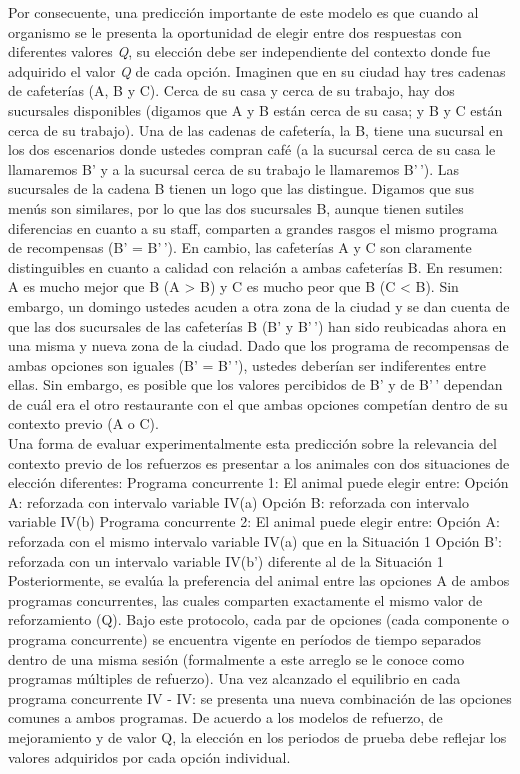 \documentclass[
  letterpaper,
]{book}
\begin{document}
Por consecuente, una predicción importante de este modelo es que cuando
al organismo se le presenta la oportunidad de elegir entre dos
respuestas con diferentes valores \emph{Q}, su elección debe ser
independiente del contexto donde fue adquirido el valor \emph{Q} de cada
opción. Imaginen que en su ciudad hay tres cadenas de cafeterías (A, B y
C). Cerca de su casa y cerca de su trabajo, hay dos sucursales
disponibles (digamos que A y B están cerca de su casa; y B y C están
cerca de su trabajo). Una de las cadenas de cafetería, la B, tiene una
sucursal en los dos escenarios donde ustedes compran café (a la sucursal
cerca de su casa le llamaremos B' y a la sucursal cerca de su trabajo le
llamaremos B'\,'). Las sucursales de la cadena B tienen un logo que las
distingue. Digamos que sus menús son similares, por lo que las dos
sucursales B, aunque tienen sutiles diferencias en cuanto a su staff,
comparten a grandes rasgos el mismo programa de recompensas (B' =
B'\,'). En cambio, las cafeterías A y C son claramente distinguibles en
cuanto a calidad con relación a ambas cafeterías B. En resumen: A es
mucho mejor que B (A \textgreater{} B) y C es mucho peor que B (C
\textless{} B). Sin embargo, un domingo ustedes acuden a otra zona de la
ciudad y se dan cuenta de que las dos sucursales de las cafeterías B (B'
y B'\,') han sido reubicadas ahora en una misma y nueva zona de la
ciudad. Dado que los programa de recompensas de ambas opciones son
iguales (B' = B'\,'), ustedes deberían ser indiferentes entre ellas. Sin
embargo, es posible que los valores percibidos de B' y de B'\,' dependan
de cuál era el otro restaurante con el que ambas opciones competían
dentro de su contexto previo (A o C).\\
Una forma de evaluar experimentalmente esta predicción sobre la
relevancia del contexto previo de los refuerzos es presentar a los
animales con dos situaciones de elección diferentes: Programa
concurrente 1: El animal puede elegir entre: Opción A: reforzada con
intervalo variable IV(a) Opción B: reforzada con intervalo variable
IV(b) Programa concurrente 2: El animal puede elegir entre: Opción A:
reforzada con el mismo intervalo variable IV(a) que en la Situación 1
Opción B': reforzada con un intervalo variable IV(b') diferente al de la
Situación 1 Posteriormente, se evalúa la preferencia del animal entre
las opciones A de ambos programas concurrentes, las cuales comparten
exactamente el mismo valor de reforzamiento (Q). Bajo este protocolo,
cada par de opciones (cada componente o programa concurrente) se
encuentra vigente en períodos de tiempo separados dentro de una misma
sesión (formalmente a este arreglo se le conoce como programas múltiples
de refuerzo). Una vez alcanzado el equilibrio en cada programa
concurrente IV - IV: se presenta una nueva combinación de las opciones
comunes a ambos programas. De acuerdo a los modelos de refuerzo, de
mejoramiento y de valor Q, la elección en los periodos de prueba debe
reflejar los valores adquiridos por cada opción individual.
\end{document}
